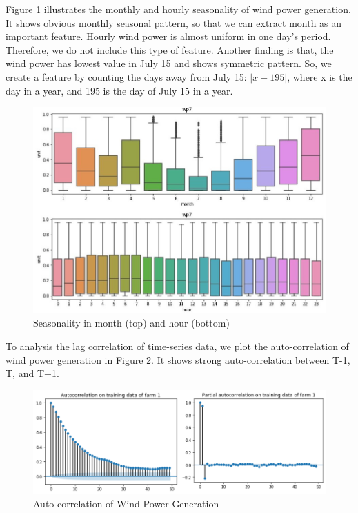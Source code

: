 \documentclass[conference]{IEEEtran}
\begin{document}
Figure \ref{fig:season} illustrates the monthly and hourly seasonality of wind power generation. It shows obvious monthly seasonal pattern, so that we can extract month as an important feature. Hourly wind power is almost uniform in one day’s period. Therefore, we do not include this type of feature. Another finding is that, the wind power has lowest value in July 15 and shows symmetric pattern. So, we create a feature by counting the days away from July 15: $|x-195|$, where x is the day in a year, and 195 is the day of July 15 in a year. 
\begin{figure}
\centering
\includegraphics[width=0.9\columnwidth]{FIG/season}
\caption{Seasonality in month (top) and hour (bottom)}
\label{fig:season}
\end{figure}

To analysis the lag correlation of time-series data, we plot the auto-correlation of wind power generation in Figure \ref{fig:auto}. It shows strong auto-correlation between T-1, T, and T+1. 
\begin{figure}
\centering
\includegraphics[width=0.9\columnwidth]{FIG/auto}
\caption{Auto-correlation of Wind Power Generation}
\label{fig:auto}
\end{figure}
\end{document}
